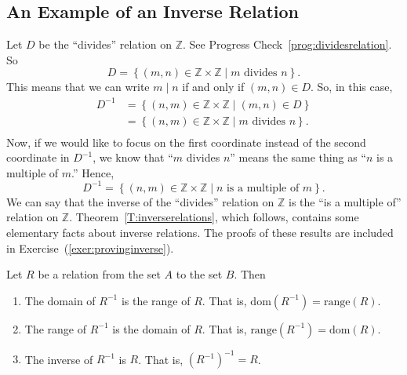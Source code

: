 \subsection*{An Example of an Inverse Relation}
Let $D$ be the ``divides'' relation on  $\mathbb{Z}$.  See Progress 
Check~\ref{prog:dividesrelation}.  So
\[
D = \left\{ { {\left( {m, n} \right) \in \mathbb{Z} \times \mathbb{Z} } \mid m\text{  divides  }n} \right\}\!.
\]
This means that we can write
$m \mid n$ if and only if $\left( {m, n} \right) \in D$.
So, in this case,
\[
\begin{aligned}
D^{ - 1}  &= \left\{ { {\left( {n, m} \right) \in \mathbb{Z} \times \mathbb{Z} } \mid \left( {m, n} \right) \in D} \right\} \\ 
          &= \left\{ { {\left( {n, m} \right) \in \mathbb{Z} \times \mathbb{Z} } \mid m\text{  divides  }n} \right\}\!. \\ 
\end{aligned}
\]
Now, if we would like to focus on the first coordinate instead of the second coordinate in  
$D^{ - 1} $, we know that  ``$m$  divides  $n$''  means the same thing as  ``$n$  is a multiple of  $m$.''  Hence,
\[
D^{ - 1}  = \left\{ { {\left( {n, m} \right) \in \mathbb{Z} \times \mathbb{Z} } \mid n\text{  is a multiple of  }m} \right\}\!.
\]
We can say that the inverse of the ``divides'' relation on  $\mathbb{Z}$  is the ``is a multiple of'' relation on  $\mathbb{Z}$.
\hbreak
%
Theorem~\ref{T:inverserelations}, which follows, contains some elementary facts about inverse relations.  The proofs of these results are included in Exercise~(\ref{exer:provinginverse}).
%
\begin{theorem} \label{T:inverserelations}
Let  $R$  be a relation from the set  $A$  to the set  $B$.  Then

\begin{enumerate}
\item The domain of  $R^{ - 1} $ is the range of  $R$.  That is, 
$\text{dom}\!\left( {R^{ - 1} } \right) = \text{range}( R )$.  \label{T:inverserelations1}

\item The range of  $R^{ - 1} $  is the domain of  $R$.   That is, 
$\text{range}\!\left( {R^{ - 1} } \right) = \text{dom}( R )$.  \label{T:inverserelations2}

\item The inverse of  $R^{ - 1} $  is  $R$.  That is, $\left( {R^{ - 1} } \right)^{ - 1}  = R$.  \label{T:inverserelations3}

\end{enumerate}
\end{theorem}


\endinput
